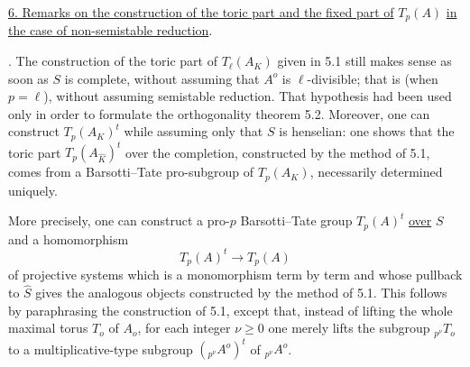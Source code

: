 %

\medskip
\noindent
\underline{6. Remarks on the construction of the toric part and the fixed
part of} $T_p(A)$ \underline{in the case of non-semistable reduction}.

\medskip
{}. The construction of the toric part of $T_\ell(A_K)$ given in 5.1
still makes sense as soon as $S$ is complete, without assuming that
$A^o$ is $\ell$-divisible; that is (when $p=\ell$), without assuming
semistable reduction.  That hypothesis had been used only in order to
formulate the orthogonality theorem 5.2.  Moreover, one can construct
$T_p(A_K)^t$ while assuming only that $S$ is henselian: one shows that
the toric part $T_p(A_{\widehat K})^t$ over the completion, constructed
by the method of 5.1, comes from a Barsotti--Tate pro-subgroup of
$T_p(A_K)$, necessarily determined uniquely.

More precisely, one can construct a pro-$p$ Barsotti--Tate group
$T_p(A)^t$ \underline{over} $S$ and a homomorphism
\[
 T_p(A)^t\longrightarrow T_p(A)
\]
of projective systems which is a monomorphism term by term and whose
pullback to $\widehat S$ gives the analogous objects constructed by the
method of 5.1.  This follows by paraphrasing the construction of 5.1,
except that, instead of lifting the whole maximal torus $T_o$ of $A_o$,
for each integer $\nu\geq0$ one merely lifts the subgroup
${}_{p^\nu}T_o$ to a multiplicative-type subgroup
$({}_{p^\nu}A^o)^t$ of ${}_{p^\nu}A^o$.

